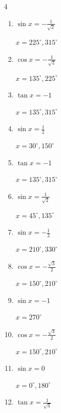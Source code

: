 \begin{multicols}{4}
\begin{enumerate}
        $\displaystyle x = 240^{\circ} , 300^{\circ}$

  \item $\displaystyle \sin{x}  = -\frac{1}{\sqrt{2}}$

        $\displaystyle x = 225^{\circ} , 315^{\circ}$

  \item $\displaystyle \cos{x}  = -\frac{1}{\sqrt{2}}$

        $\displaystyle x = 135^{\circ} , 225^{\circ}$

  \item $\displaystyle \tan{x}  = -1$

        $\displaystyle x = 135^{\circ} , 315^{\circ}$

\columnbreak %

  \item $\displaystyle \sin{x}  = \frac{1}{2}$

        $\displaystyle x = 30^{\circ} , 150^{\circ}$

  \item $\displaystyle \tan{x}  = -1$

        $\displaystyle x = 135^{\circ} , 315^{\circ}$

  \item $\displaystyle \sin{x}  = \frac{1}{\sqrt{2}}$

        $\displaystyle x = 45^{\circ} , 135^{\circ}$

  \item $\displaystyle \sin{x}  = -\frac{1}{2}$

        $\displaystyle x = 210^{\circ} , 330^{\circ}$

  \item $\displaystyle \cos{x}  = -\frac{\sqrt{3}}{2}$

        $\displaystyle x = 150^{\circ} , 210^{\circ}$

  \item $\displaystyle \sin{x}  = -1$

        $\displaystyle x = 270^{\circ}$

  \item $\displaystyle \cos{x}  = -\frac{\sqrt{3}}{2}$

        $\displaystyle x = 150^{\circ} , 210^{\circ}$

  \item $\displaystyle \sin{x}  = 0$

        $\displaystyle x = 0^{\circ} , 180^{\circ}$

  \item $\displaystyle \tan{x}  = \frac{1}{\sqrt{3}}$


\end{enumerate}
\end{multicols}
